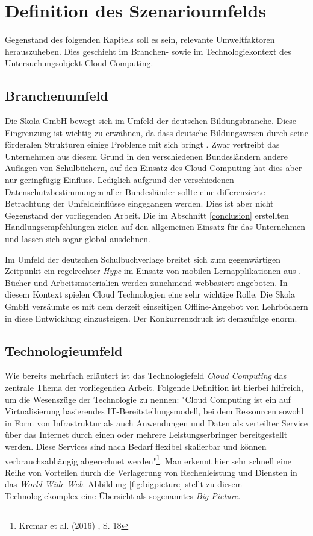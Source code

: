 \section{Definition des Szenarioumfelds}
\label{environment}

Gegenstand des folgenden Kapitels soll es sein, relevante Umweltfaktoren herauszuheben. Dies geschieht  im Branchen- sowie im Technologiekontext des Untersuchungsobjekt Cloud Computing. 

\subsection{Branchenumfeld}
Die Skola GmbH bewegt sich im Umfeld der deutschen Bildungsbranche. Diese Eingrenzung ist wichtig zu erwähnen, da dass deutsche Bildungswesen durch seine förderalen Strukturen einige Probleme mit sich bringt \cite{grella}. Zwar vertreibt das Unternehmen aus diesem Grund in den verschiedenen Bundesländern andere Auflagen von Schulbüchern, auf den Einsatz des Cloud Computing hat dies aber nur geringfügig Einfluss. Lediglich aufgrund der verschiedenen Datenschutzbestimmungen aller Bundesländer sollte eine differenzierte Betrachtung der Umfeldeinflüsse eingegangen werden. Dies ist aber nicht Gegenstand der vorliegenden Arbeit. Die im Abschnitt \ref{conclusion} erstellten Handlungsempfehlungen zielen auf den allgemeinen Einsatz für das Unternehmen und lassen sich sogar global ausdehnen.

Im Umfeld der deutschen Schulbuchverlage breitet sich zum gegenwärtigen Zeitpunkt ein regelrechter \textit{Hype} im Einsatz von mobilen Lernapplikationen aus \cite{specht}. Bücher und Arbeitsmaterialien werden zunehmend webbasiert angeboten. In diesem Kontext spielen Cloud Technologien eine sehr wichtige Rolle. Die Skola GmbH versäumte es mit dem derzeit einseitigen Offline-Angebot von Lehrbüchern in diese Entwicklung einzusteigen. Der Konkurrenzdruck ist demzufolge enorm.
	
\subsection{Technologieumfeld}
Wie bereits mehrfach erläutert ist das Technologiefeld \textit{Cloud Computing} das zentrale Thema der vorliegenden Arbeit. Folgende Definition ist hierbei hilfreich, um die Wesenszüge der Technologie zu nennen: "Cloud Computing ist ein auf Virtualisierung basierendes IT-Bereitstellungsmodell, bei dem Ressourcen sowohl in Form von Infrastruktur als auch Anwendungen und Daten als verteilter Service über das Internet durch einen oder mehrere Leistungserbringer bereitgestellt werden. Diese Services sind nach Bedarf flexibel skalierbar und können verbrauchsabhängig abgerechnet werden"\footnote{Krcmar et al. (2016) \cite{krcmar}, S. 18}. Man erkennt hier sehr schnell eine Reihe von Vorteilen durch die Verlagerung von Rechenleistung und Diensten in das \textit{World Wide Web}. Abbildung \ref{fig:bigpicture} stellt zu diesem Technologiekomplex eine Übersicht als sogenanntes \textit{Big Picture}.

